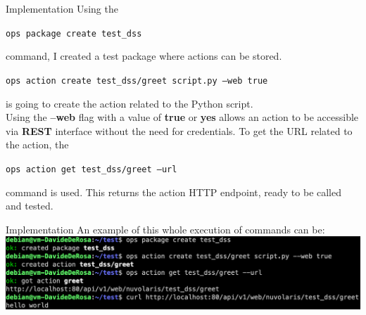 \documentclass[aspectratio=169]{beamer}
\begin{document}
\begin{frame}{Implementation}
Using the \vspace{-15pt}
\begin{center}
    \colorbox{codegray}{\texttt{ops package create test\_dss}}\vspace{-5pt}
\end{center} 
command, I created a test package where actions can be stored.\vspace{-5pt}
\begin{center}
    \colorbox{codegray}{\texttt{ops action create test\_dss/greet script.py --web true}}\vspace{-5pt} 
\end{center}
is going to create the action related to the Python script.\\
Using the \textbf{–web} flag with a value of \textbf{true} or \textbf{yes} allows an action to be accessible via \textbf{REST} interface without the need for credentials.
To get the URL related to the action, the \vspace{-15pt}
\begin{center}
    \colorbox{codegray}{\texttt{ops action get test\_dss/greet --url}}\vspace{-5pt}
\end{center}
command is used. This returns the action HTTP endpoint, ready to be called and tested.
\end{frame}

\begin{frame}{Implementation}
An example of this whole execution of commands can be:\vspace{14pt}\\
\centering
\includegraphics[width=1\textwidth]{img/demo.png}
\end{frame}
\end{document}
